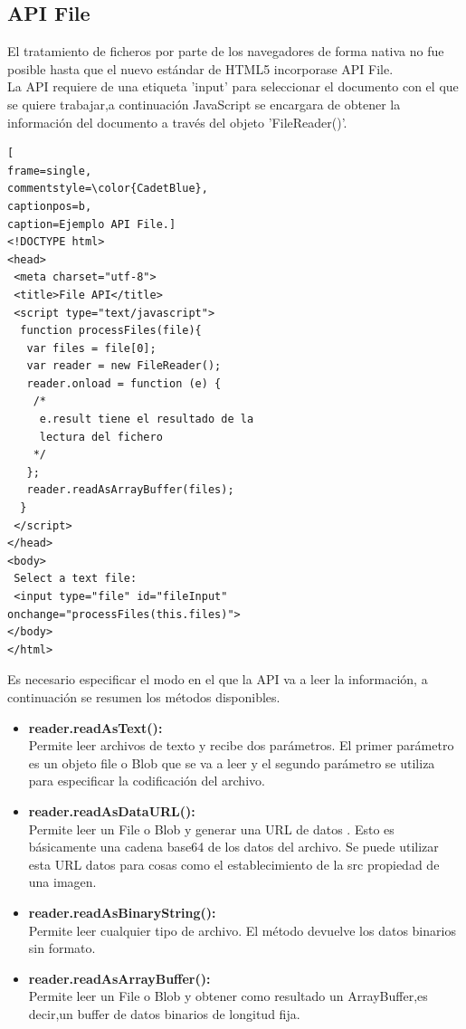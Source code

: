 \subsection{API File}
El tratamiento de ficheros por parte de los navegadores de forma nativa no fue posible hasta que el nuevo estándar de HTML5 incorporase API File.
\\La API requiere de una etiqueta 'input' para seleccionar el documento con el que se quiere trabajar,a continuación JavaScript se encargara de obtener la información del documento a través del objeto 'FileReader()'.
\begin{lstlisting}[
frame=single,
commentstyle=\color{CadetBlue},
captionpos=b,
caption=Ejemplo API File.]
<!DOCTYPE html>
<head>
 <meta charset="utf-8">
 <title>File API</title>
 <script type="text/javascript">
  function processFiles(file){
   var files = file[0];
   var reader = new FileReader();
   reader.onload = function (e) {
    /*
     e.result tiene el resultado de la 
     lectura del fichero
    */
   };
   reader.readAsArrayBuffer(files);
  }
 </script>
</head>
<body>
 Select a text file:
 <input type="file" id="fileInput" onchange="processFiles(this.files)">
</body>
</html>
\end{lstlisting}
Es necesario especificar el modo en el que la API va a leer la información, a continuación se resumen los métodos disponibles.
\begin{itemize}
\item \textbf{reader.readAsText():}
\\Permite leer archivos de texto y recibe dos parámetros. El primer parámetro es un objeto file o Blob que se va a leer y el segundo parámetro se utiliza para especificar la codificación del archivo.
\item \textbf{reader.readAsDataURL():}
\\Permite leer un File o Blob y generar una URL de datos . Esto es básicamente una cadena base64 de los datos del archivo. Se puede utilizar esta URL datos para cosas como el establecimiento de la src propiedad de una imagen.
\item \textbf{reader.readAsBinaryString():}
\\Permite leer cualquier tipo de archivo. El método devuelve los datos binarios sin formato.
\item \textbf{reader.readAsArrayBuffer():} 
\\Permite leer un File o Blob y obtener como resultado un ArrayBuffer,es decir,un buffer de datos binarios de longitud fija.
\end{itemize}
